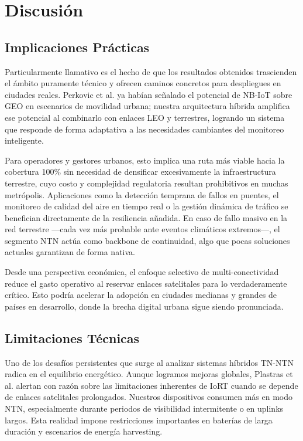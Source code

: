 \section{Discusión}

\subsection{Implicaciones Prácticas}

Particularmente llamativo es el hecho de que los resultados obtenidos trascienden el ámbito puramente técnico y ofrecen caminos concretos para despliegues en ciudades reales. Perkovic et al. \cite{Perkovic2025} ya habían señalado el potencial de NB-IoT sobre GEO en escenarios de movilidad urbana; nuestra arquitectura híbrida amplifica ese potencial al combinarlo con enlaces LEO y terrestres, logrando un sistema que responde de forma adaptativa a las necesidades cambiantes del monitoreo inteligente.

Para operadores y gestores urbanos, esto implica una ruta más viable hacia la cobertura 100\% sin necesidad de densificar excesivamente la infraestructura terrestre, cuyo costo y complejidad regulatoria resultan prohibitivos en muchas metrópolis. Aplicaciones como la detección temprana de fallos en puentes, el monitoreo de calidad del aire en tiempo real o la gestión dinámica de tráfico se benefician directamente de la resiliencia añadida. En caso de fallo masivo en la red terrestre —cada vez más probable ante eventos climáticos extremos—, el segmento NTN actúa como backbone de continuidad, algo que pocas soluciones actuales garantizan de forma nativa.

Desde una perspectiva económica, el enfoque selectivo de multi-conectividad reduce el gasto operativo al reservar enlaces satelitales para lo verdaderamente crítico. Esto podría acelerar la adopción en ciudades medianas y grandes de países en desarrollo, donde la brecha digital urbana sigue siendo pronunciada.

\subsection{Limitaciones Técnicas}

Uno de los desafíos persistentes que surge al analizar sistemas híbridos TN-NTN radica en el equilibrio energético. Aunque logramos mejoras globales, Plastras et al. \cite{Plastras2024} alertan con razón sobre las limitaciones inherentes de IoRT cuando se depende de enlaces satelitales prolongados. Nuestros dispositivos consumen más en modo NTN, especialmente durante periodos de visibilidad intermitente o en uplinks largos. Esta realidad impone restricciones importantes en baterías de larga duración y escenarios de energía harvesting.

